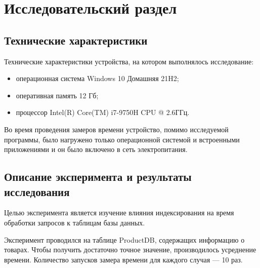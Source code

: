 \chapter{Исследовательский раздел}

\section{Технические характеристики}

Технические характеристики устройства, на котором выполнялось исследование:
\begin{itemize}[label=---]
	\item операционная система Windows 10 Домашняя 21H2;
	\item оперативная память 12 Гб;
	\item процессор Intel(R) Core(TM) i7-9750H CPU @ 2.6ГГц.
\end{itemize}

Во время проведения замеров времени устройство, помимо исследуемой программы, было нагружено только операционной системой и встроенными приложениями и он было включено в сеть электропитания.

\section{Описание эксперимента и результаты исследования}

Целью эксперимента является изучение влияния индексирования на время обработки запросов к таблицам базы данных.

Эксперимент проводился на таблице ProductDB, содержащих информацию о товарах. Чтобы получить достаточно точное значение, производилось усреднение времени. Количество запусков замера времени для каждого случая --- 10 раз.

